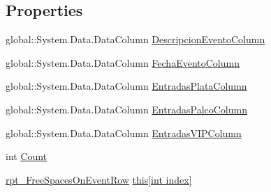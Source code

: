 \subsection*{Properties}
\begin{DoxyCompactItemize}
\item 
global\+::\+System.\+Data.\+Data\+Column \hyperlink{classprj_progra_i_i_i_1_1rpt___free_spaces_on_event_1_1rpt___free_spaces_on_event_data_table_a78f8827bd45545ce4acfbf26895d1e6a}{Descripcion\+Evento\+Column}
\item 
global\+::\+System.\+Data.\+Data\+Column \hyperlink{classprj_progra_i_i_i_1_1rpt___free_spaces_on_event_1_1rpt___free_spaces_on_event_data_table_a3c9f13f36fea939d87c2f1fb440156c1}{Fecha\+Evento\+Column}
\item 
global\+::\+System.\+Data.\+Data\+Column \hyperlink{classprj_progra_i_i_i_1_1rpt___free_spaces_on_event_1_1rpt___free_spaces_on_event_data_table_a51123508041cbecc433e6bffca12e231}{Entradas\+Plata\+Column}
\item 
global\+::\+System.\+Data.\+Data\+Column \hyperlink{classprj_progra_i_i_i_1_1rpt___free_spaces_on_event_1_1rpt___free_spaces_on_event_data_table_a23d6af933824dbcf9a7b65bc5ff47827}{Entradas\+Palco\+Column}
\item 
global\+::\+System.\+Data.\+Data\+Column \hyperlink{classprj_progra_i_i_i_1_1rpt___free_spaces_on_event_1_1rpt___free_spaces_on_event_data_table_abeddd5976951acebb14c7982be8e7252}{Entradas\+V\+I\+P\+Column}
\item 
int \hyperlink{classprj_progra_i_i_i_1_1rpt___free_spaces_on_event_1_1rpt___free_spaces_on_event_data_table_aae1ea79c3c276771f38878642b2f8a16}{Count}
\item 
\hyperlink{classprj_progra_i_i_i_1_1rpt___free_spaces_on_event_1_1rpt___free_spaces_on_event_row}{rpt\+\_\+\+Free\+Spaces\+On\+Event\+Row} \hyperlink{classprj_progra_i_i_i_1_1rpt___free_spaces_on_event_1_1rpt___free_spaces_on_event_data_table_a202813b8d39eb8ab9fd22976d0d1f46f}{this\mbox{[}int index\mbox{]}}
\end{DoxyCompactItemize}
